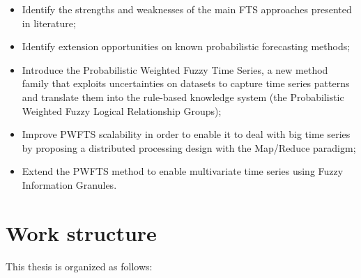 \begin{itemize}
\item Identify the strengths and weaknesses of the main FTS approaches presented in literature;
\item Identify extension opportunities on known probabilistic forecasting methods;
\item Introduce the Probabilistic Weighted Fuzzy Time Series, a new method family that exploits uncertainties on datasets to capture time series patterns and translate them into the rule-based knowledge system (the Probabilistic Weighted Fuzzy Logical Relationship Groups);
\item Improve PWFTS scalability in order to enable it to deal with big time series by proposing a distributed processing design with the Map/Reduce paradigm; 
\item Extend the PWFTS method to enable multivariate time series using Fuzzy Information Granules.
\end{itemize}

\section{Work structure} 

This thesis is organized as follows:

